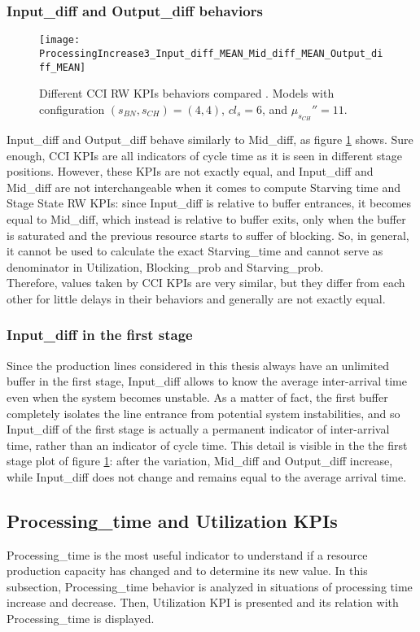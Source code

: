 \subsubsection{Input\_diff and Output\_diff behaviors}
\begin{figure}[h] 
\centering
\texttt{[image: ProcessingIncrease3\_Input\_diff\_MEAN\_Mid\_diff\_MEAN\_Output\_diff\_MEAN]}
\caption[Different CCI RW KPIs behaviors compared]{Different CCI RW KPIs behaviors compared . Models with configuration $(s_{BN},s_{CH})=(4,4)$, $cl_s=6$, and $\mu_{s_{CH}}''=11$.}
\label{fig:Different CCI RW KPIs behaviors compared}
\end{figure}
Input\_diff and Output\_diff behave similarly to Mid\_diff, as figure \ref{fig:Different CCI RW KPIs behaviors compared} shows. Sure enough, CCI KPIs are all indicators of cycle time as it is seen in different stage positions. However, these KPIs are not exactly equal, and Input\_diff and Mid\_diff are not interchangeable when it comes to compute Starving time and Stage State RW KPIs: since Input\_diff is relative to buffer entrances, it becomes equal to Mid\_diff, which instead is relative to buffer exits, only when the buffer is saturated and the previous resource starts to suffer of blocking. So, in general, it cannot be used to calculate the exact Starving\_time and cannot serve as denominator in Utilization, Blocking\_prob and Starving\_prob.\\
Therefore, values taken by CCI KPIs are very similar, but they differ from each other for little delays in their behaviors and generally are not exactly equal.
\subsubsection{Input\_diff in the first stage}
Since the production lines considered in this thesis always have an unlimited buffer in the first stage, Input\_diff allows to know the average inter-arrival time even when the system becomes unstable. As a matter of fact, the first buffer completely isolates the line entrance from potential system instabilities, and so Input\_diff of the first stage is actually a permanent indicator of inter-arrival time, rather than an indicator of cycle time. This detail is visible in the the first stage plot of figure \ref{fig:Different CCI RW KPIs behaviors compared}: after the variation, Mid\_diff and Output\_diff increase, while Input\_diff does not change and remains equal to the average arrival time.
\newpage
\subsection{Processing\_time and Utilization KPIs}
\label{Processing time and Utilization KPIs - Processing time variation}
Processing\_time is the most useful indicator to understand if a resource production capacity has changed and to determine its new value. In this subsection, Processing\_time behavior is analyzed in situations of processing time increase and decrease. Then, Utilization KPI is presented and its relation with Processing\_time is displayed. 
